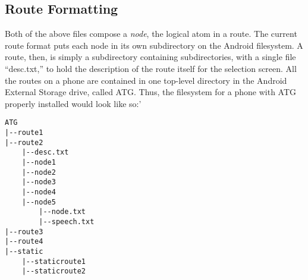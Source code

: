 \subsection{Route Formatting}
Both of the above files compose a \emph{node}, the logical atom in a route. The current route format puts each node in its own subdirectory
on the Android filesystem. A route, then, is simply a subdirectory containing subdirectories, with a single file ``desc.txt,'' to hold the
description of the route itself for the selection screen. All the routes on a phone are contained in one top-level directory in the
Android External Storage drive, called ATG. Thus, the filesystem for a phone with ATG properly installed would look like so:'
\begin{verbatim}
ATG
|--route1
|--route2
	|--desc.txt
	|--node1
	|--node2
	|--node3
	|--node4
	|--node5
		|--node.txt
		|--speech.txt
|--route3
|--route4
|--static
	|--staticroute1
	|--staticroute2
\end{verbatim}

